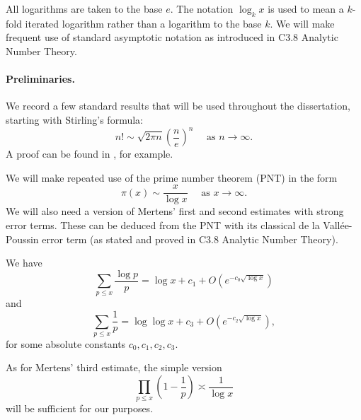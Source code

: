 All logarithms are taken to the base $e$.
The notation $\log_k x$ is used to mean a $k$-fold iterated logarithm rather than a logarithm to the base $k$.
We will make frequent use of standard asymptotic notation as introduced in C3.8 Analytic Number Theory.

\paragraph{Preliminaries.}
We record a few standard results that will be used throughout the dissertation, starting with Stirling's formula:
\begin{equation*}
    n! \sim \sqrt{2 \pi n} \left( \frac{n}{e} \right)^n \quad \text{ as } n \rightarrow \infty.
\end{equation*}
A proof can be found in \cite[Pages 52--53]{feller}, for example.

We will make repeated use of the prime number theorem (PNT) in the form 
\begin{equation*}
    \pi(x) \sim \frac{x}{\log x} \quad \text{ as } x \rightarrow \infty.
\end{equation*}
We will also need a version of Mertens' first and second estimates with strong error terms. 
These can be deduced from the PNT with its classical de la Vallée-Poussin error term (as stated and proved in C3.8 Analytic Number Theory).

\begin{theorem} \label{thm:mertens-with-strong-error-terms}
    We have
    \begin{equation} \label{eq:mertens-first}
        \sum \limits_{p \le x} \frac{\log p}{p} = \log x + c_1 + O (e^{-c_0 \sqrt{\log x}})
    \end{equation}
    and 
    \begin{equation} \label{eq:mertens-second}
        \sum \limits_{p \le x} \frac{1}{p} = \log \log x + c_3 + O (e^{-c_2 \sqrt{\log x}}),
    \end{equation}
    for some absolute constants $c_0, c_1, c_2, c_3$.
\end{theorem}
As for Mertens' third estimate, the simple version 
\begin{equation*}
    \prod \limits_{p \le x} \left(1 - \frac{1}{p} \right) \asymp \frac{1}{\log x}
\end{equation*}
will be sufficient for our purposes.

